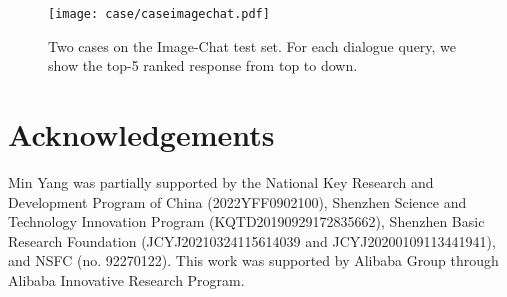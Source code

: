 \documentclass[11pt]{article}
\begin{document}
\begin{figure}[h]
    \small
    \centering
    \texttt{[image: case/caseimagechat.pdf]}
    \caption{Two cases on the Image-Chat test set. For each dialogue query, we show the top-5 ranked response from top to down.}
    \label{caseimage}
\end{figure}

\section*{Acknowledgements}
Min Yang was partially supported by the National Key Research and Development Program of China (2022YFF0902100), Shenzhen Science and Technology Innovation Program (KQTD20190929172835662), Shenzhen Basic Research Foundation (JCYJ20210324115614039 and JCYJ20200109113441941), and NSFC (no. 92270122). This work was supported by Alibaba Group through Alibaba Innovative Research Program.










\appendix



\appendix
\newpage
\end{document}
